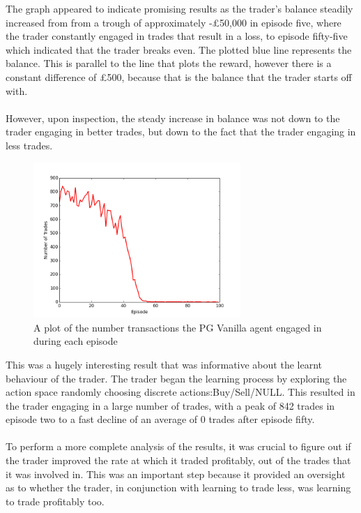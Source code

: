 \documentclass[ %
                    author={Ashwinder Khurana},
                supervisor={Prof Dave Cliff},
                    degree={MEng},
                     title={The Deeply Reinforced Trader},
                  subtitle={},
                      type={enterprise},
                      year={2020} ]{dissertation}
\begin{document}
{The graph appeared to indicate promising results as the trader's balance steadily increased from from a trough of approximately -£50,000 in episode five, where the trader constantly engaged in trades that result in a loss, to episode fifty-five which indicated that the trader breaks even. The plotted blue line represents the balance. This is parallel to the line that plots the reward, however there is a constant difference of £500, because that is the balance that the trader starts off with. 
\\
\\
However, upon inspection, the steady increase in balance was not down to the trader engaging in better trades, but down to the fact that the trader engaging in less trades. 

\begin{figure}[H] 
	\centering
  	\includegraphics[width=0.7\textwidth]{PG-Vanilla-Num-Trades.png}
  	\caption{A plot of the number transactions the PG Vanilla agent engaged in during each episode }
	\label{fig:PG-Vanilla-Num-Trades}  
\end{figure}

\noindent
This was a hugely interesting result that was informative about the learnt behaviour of the trader. The trader began the learning process by exploring the action space randomly choosing discrete actions:Buy/Sell/NULL. This resulted in the trader engaging in a large number of trades, with a peak of 842 trades in episode two to a fast decline of an average of 0 trades after episode fifty. 
\\
\\
\noindent
To perform a more complete analysis of the results, it was crucial to figure out if the trader improved the rate at which it traded profitably, out of the trades that it was involved in. This was an important step because it provided an oversight as to whether the trader, in conjunction with learning to trade less, was learning to trade profitably too.

}
\end{document}
